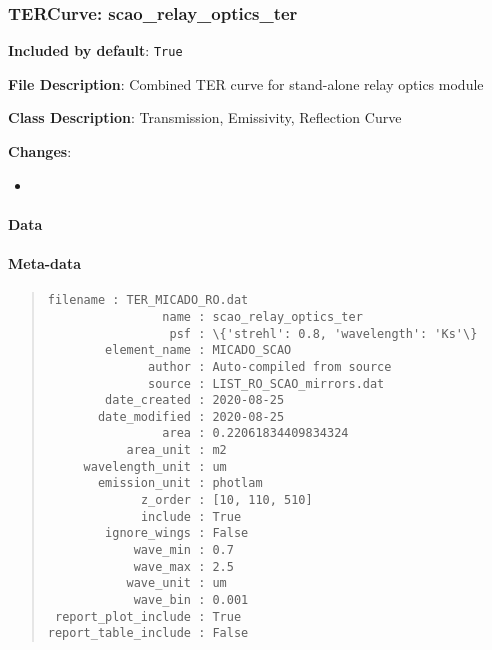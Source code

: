 \subsubsection{TERCurve: \textquotedbl{}scao\_relay\_optics\_ter\textquotedbl{}%
  \label{tercurve-scao-relay-optics-ter}%
}

\textbf{Included by default}: \texttt{True}

\textbf{File Description}: Combined TER curve for stand-alone relay optics module

\textbf{Class Description}: Transmission, Emissivity, Reflection Curve

\textbf{Changes}:

\begin{itemize}
\item \end{itemize}


\paragraph{Data%
  \label{data}%
}

\begin{figure}[H]
\noindent{}\label{fig-scao-relay-optics-ter}
\end{figure}


\paragraph{Meta-data%
  \label{meta-data}%
}

\begin{quote}
\begin{alltt}
\begin{lstlisting}[frame=single]
            filename : TER_MICADO_RO.dat
                name : scao_relay_optics_ter
                 psf : \{'strehl': 0.8, 'wavelength': 'Ks'\}
        element_name : MICADO_SCAO
              author : Auto-compiled from source
              source : LIST_RO_SCAO_mirrors.dat
        date_created : 2020-08-25
       date_modified : 2020-08-25
                area : 0.22061834409834324
           area_unit : m2
     wavelength_unit : um
       emission_unit : photlam
             z_order : [10, 110, 510]
             include : True
        ignore_wings : False
            wave_min : 0.7
            wave_max : 2.5
           wave_unit : um
            wave_bin : 0.001
 report_plot_include : True
report_table_include : False
\end{lstlisting}
\end{alltt}
\end{quote}


